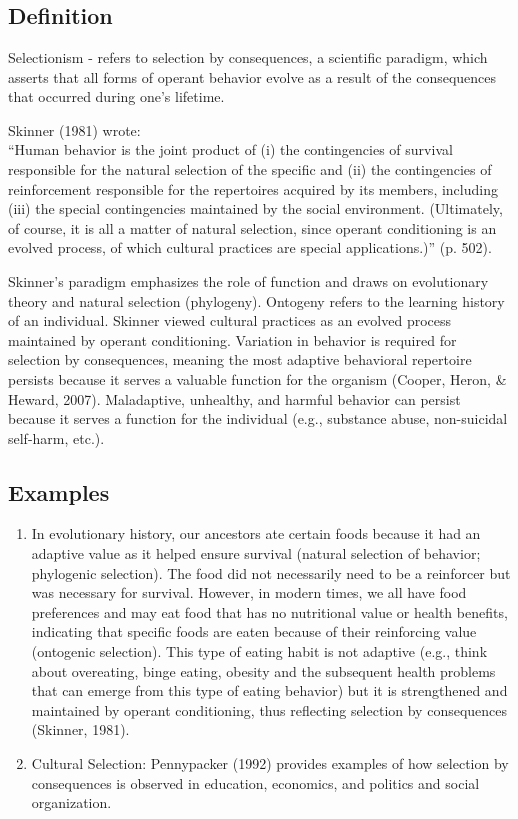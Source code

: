 \clearpage \section{\fourFKTwo{}}
\subsection{Definition} 
Selectionism - refers to selection by consequences, a scientific paradigm, which asserts that all forms of operant behavior evolve as a result of the consequences that occurred during one's lifetime.

Skinner (1981) wrote:\\

``Human behavior is the joint product of (i) the contingencies of survival responsible for the natural selection of the specific and (ii) the contingencies of reinforcement responsible for the repertoires acquired by its members, including (iii) the special contingencies maintained by the social environment. (Ultimately, of course, it is all a matter of natural selection, since operant conditioning is an evolved process, of which cultural practices are special applications.)'' (p. 502).  

Skinner's paradigm emphasizes the role of function and draws on evolutionary theory and natural selection (phylogeny). Ontogeny refers to the learning history of an individual. Skinner viewed cultural practices as an evolved process maintained by operant conditioning. Variation in behavior is required for selection by consequences, meaning the most adaptive behavioral repertoire persists because it serves a valuable function for the organism (Cooper, Heron, \& Heward, 2007). Maladaptive, unhealthy, and harmful behavior can persist because it serves a function for the individual (e.g., substance abuse, non-suicidal self-harm, etc.).

\subsection{Examples}
\begin{enumerate}
\item In evolutionary history, our ancestors ate certain foods because it had an adaptive value as it helped ensure survival (natural selection of behavior; phylogenic selection).  The food did not necessarily need to be a reinforcer but was necessary for survival.  However, in modern times, we all have food preferences and may eat food that has no nutritional value or health benefits, indicating that specific foods are eaten because of their reinforcing value (ontogenic selection).  This type of eating habit is not adaptive (e.g., think about overeating, binge eating, obesity and the subsequent health problems that can emerge from this type of eating behavior) but it is strengthened and maintained by operant conditioning, thus reflecting selection by consequences (Skinner, 1981).  
\item Cultural Selection: Pennypacker (1992) provides examples of how selection by consequences is observed in education, economics, and politics and social organization. 
%
\end{enumerate}
%
